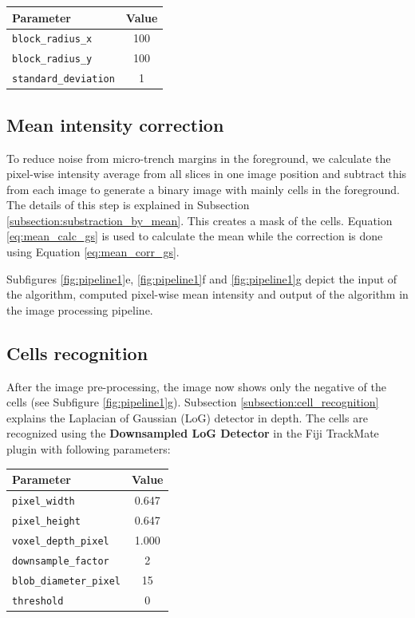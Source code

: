 \documentclass[pdftex,12pt,a4paper]{report}
\begin{document}
\begin{table}[H]
\centering
\begin{tabular}[t]{ l | c }
\hline
Parameter & Value \\
\hline\hline
\texttt{block\_radius\_x} & 100 \\
\texttt{block\_radius\_y} & 100 \\
\texttt{standard\_deviation} & 1 \\
\end{tabular}
\end{table}

\subsection{Mean intensity correction}
\label{subsection:mean_intensity_correction}

To reduce noise from micro-trench margins in the foreground, we calculate the pixel-wise intensity average from all slices in one image position and subtract this from each image to generate a binary image with mainly cells in the foreground. The details of this step is explained in Subsection \ref{subsection:substraction_by_mean}. This creates a mask of the cells.  Equation \ref{eq:mean_calc_gs} is used to calculate the mean while the correction is done using Equation \ref{eq:mean_corr_gs}.

Subfigures \ref{fig:pipeline1}e, \ref{fig:pipeline1}f and \ref{fig:pipeline1}g depict the input of the algorithm, computed pixel-wise mean intensity and output of the algorithm in the image processing pipeline.

\subsection{Cells recognition}

After the image pre-processing, the image now shows only the negative of the cells (see Subfigure \ref{fig:pipeline1}g). Subsection \ref{subsection:cell_recognition} explains the Laplacian of Gaussian (LoG) detector in depth. The cells are recognized using the \textbf{Downsampled LoG Detector} in the Fiji TrackMate plugin \cite{tinevez2017trackmate} with following parameters:

\begin{table}[H]
\centering
\begin{tabular}[t]{ l | c }
\hline
Parameter & Value \\
\hline\hline
\texttt{pixel\_width} & 0.647 \\
\texttt{pixel\_height} & 0.647 \\
\texttt{voxel\_depth\_pixel} & 1.000 \\
\texttt{downsample\_factor} & 2 \\
\texttt{blob\_diameter\_pixel} & 15 \\
\texttt{threshold} & 0 \\
\end{tabular}
\end{table}
\end{document}

